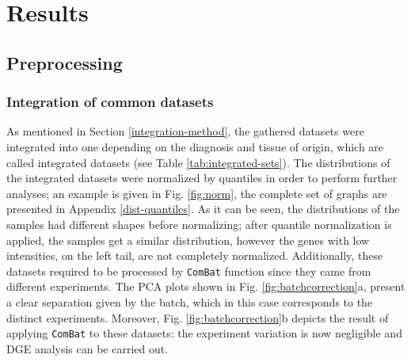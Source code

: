 \chapter{Results}
\label{chapter:Results}

\section{Preprocessing}

\subsection{Integration of common datasets}

As mentioned in Section \ref{integration-method}, the gathered datasets were integrated into one depending on the diagnosis and tissue of origin, which are called integrated datasets (see Table \ref{tab:integrated-sets}). The distributions of the integrated datasets were normalized by quantiles in order to perform further analyses; an example is given in Fig. \ref{fig:norm}, the complete set of graphs are presented in Appendix \ref{dist-quantiles}. As it can be seen, the distributions of the samples had different shapes before normalizing; after quantile normalization is applied, the samples get a similar distribution, however the genes with low intensities, on the left tail, are not completely normalized. Additionally, these datasets required to be processed by \verb|ComBat| function since they came from different experiments. The PCA plots shown in Fig. \ref{fig:batchcorrection}a, present a clear separation given by the batch, which in this case corresponds to the distinct experiments. Moreover, Fig. \ref{fig:batchcorrection}b depicts the result of applying \verb|ComBat| to these datasets: the experiment variation is now negligible and DGE analysis can be carried out. 

